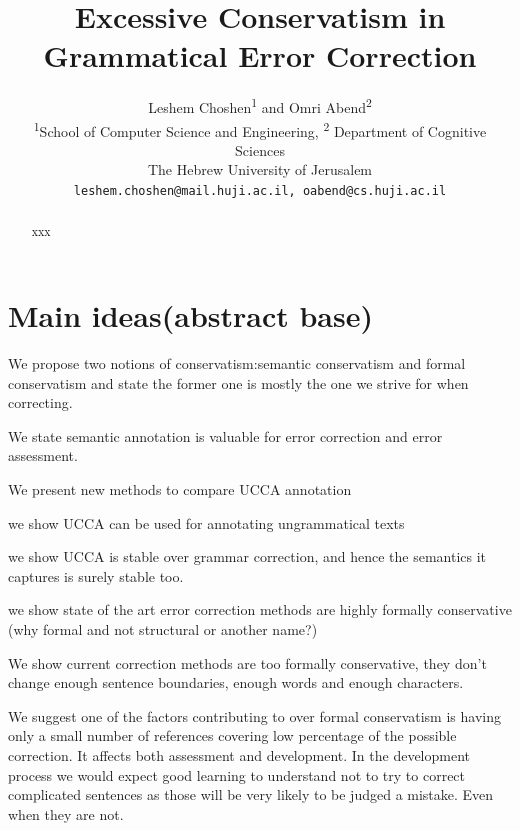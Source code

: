 \documentclass[english]{article}
\begin{document}
	
	\title{Excessive Conservatism in Grammatical Error Correction}
	
	\author{
		Leshem Choshen\textsuperscript{1} and Omri Abend\textsuperscript{2} \\
		\textsuperscript{1}School of Computer Science and Engineering, \textsuperscript{2} Department of Cognitive Sciences \\
		The Hebrew University of Jerusalem \\
		\texttt{leshem.choshen@mail.huji.ac.il, oabend@cs.huji.ac.il}\\
	}
	
	
	\maketitle
\begin{abstract}
	xxx
	
\end{abstract}

\section{Main ideas(abstract base)}

We propose two notions of conservatism:semantic conservatism and formal
conservatism and state the former one is mostly the one we strive
for when correcting.

We state semantic annotation is valuable for error correction and
error assessment.

We present new methods to compare UCCA annotation

we show UCCA can be used for annotating ungrammatical texts

we show UCCA is stable over grammar correction,
 and hence the semantics it captures is surely stable too.

we show state of the art error correction methods are highly formally
conservative (why formal and not structural or another name?)

We show current correction methods are too formally conservative,
they don't change enough sentence boundaries, enough words and enough
characters.

We suggest one of the factors contributing to over formal conservatism
is having only a small number of references covering low percentage
of the possible correction. It affects both assessment and development.
In the development process we would expect good learning to understand
not to try to correct complicated sentences as those will be very
likely to be judged a mistake. Even when they are not.
\end{document}
